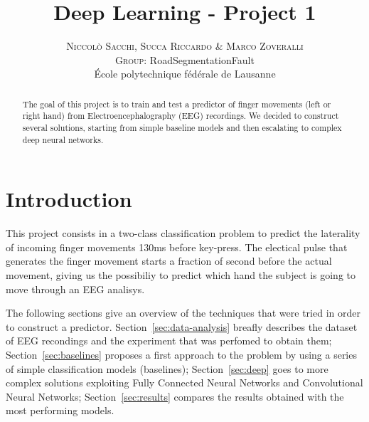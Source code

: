 \documentclass[10pt,conference,compsocconf]{IEEEtran}
\begin{document}
	
\pretitle{\begin{center}\Huge\bfseries} %
\posttitle{\end{center}} %
\title{Deep Learning - Project 1}

\author{
	\textsc{Niccol\`{o} Sacchi, Succa Riccardo \& Marco Zoveralli}
	\normalsize{} \\
	\textsc{Group:}
	\normalsize{RoadSegmentationFault}\\
	\normalsize \'{E}cole polytechnique f\'{e}d\'{e}rale de Lausanne
}

\maketitle

\begin{abstract}
  The goal of this project is to train and test a predictor of finger movements (left or right hand) from Electroencephalography (EEG) recordings. We decided to construct several solutions, starting from simple baseline models and then escalating to complex deep neural networks. 
\end{abstract}

\section{Introduction}
This project consists in a two-class classification problem to predict the laterality of incoming finger movements 130ms before key-press. The electical pulse that generates the finger movement starts a fraction of second before the actual movement, giving us the possibiliy to predict which hand the subject is going to move through an EEG analisys.


The following sections give an overview of the techniques that were tried in order to construct a predictor. Section~\ref{sec:data-analysis} breafly describes the dataset of EEG recondings and the experiment that was perfomed to obtain them; Section~\ref{sec:baselines} proposes a first approach to the problem by using a series of simple classification models (baselines); Section~\ref{sec:deep} goes to more complex solutions exploiting Fully Connected Neural Networks and Convolutional Neural Networks; Section~\ref{sec:results} compares the results obtained with the most performing models.
\end{document}
